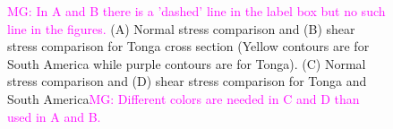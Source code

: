 \documentclass[12pt]{article}
\newcommand{\mgnote}[1]{\textcolor{magenta}{MG: #1}}
\begin{document}
\begin{figure}[H]
\centering
\hspace{-0.2cm}
\hspace{-0.2cm}
\hspace{-0.2cm}
\hspace{-0.2cm}
\caption{
\mgnote{In A and B there is a 'dashed' line in the label box but no such line in the figures.}
(A) Normal stress comparison and 
(B) shear stress comparison for Tonga cross section (Yellow contours are for South America while purple contours are for Tonga). 
(C) Normal stress comparison and (D) shear stress comparison for Tonga and South America\mgnote{Different colors are needed in C and D than used in A and B.}}
\label{fig:shear_smaller}
\end{figure}
\end{document}
